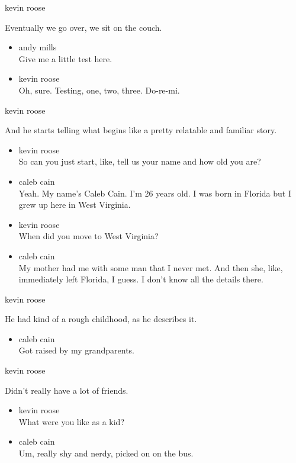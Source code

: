 kevin roose

Eventually we go over, we sit on the couch.

\begin{itemize}
\item
  andy mills\\
  Give me a little test here.
\item
  kevin roose\\
  Oh, sure. Testing, one, two, three. Do-re-mi.
\end{itemize}

kevin roose

And he starts telling what begins like a pretty relatable and familiar
story.

\begin{itemize}
\item
  kevin roose\\
  So can you just start, like, tell us your name and how old you are?
\item
  caleb cain\\
  Yeah. My name's Caleb Cain. I'm 26 years old. I was born in Florida
  but I grew up here in West Virginia.
\item
  kevin roose\\
  When did you move to West Virginia?
\item
  caleb cain\\
  My mother had me with some man that I never met. And then she, like,
  immediately left Florida, I guess. I don't know all the details there.
\end{itemize}

kevin roose

He had kind of a rough childhood, as he describes it.

\begin{itemize}
\tightlist
\item
  caleb cain\\
  Got raised by my grandparents.
\end{itemize}

kevin roose

Didn't really have a lot of friends.

\begin{itemize}
\item
  kevin roose\\
  What were you like as a kid?
\item
  caleb cain\\
  Um, really shy and nerdy, picked on on the bus.
\end{itemize}

